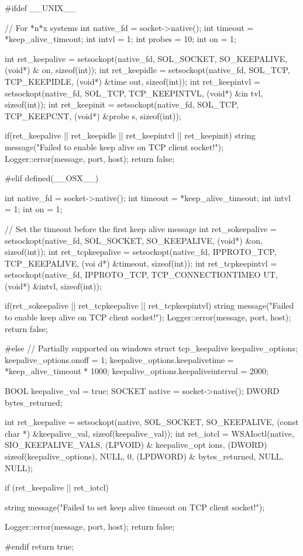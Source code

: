 \begin{DoxyCode}
{
#ifdef __UNIX__

    // For *n*x systems
    int native_fd = socket->native();
    int timeout = *keep_alive_timeout;
    int intvl = 1;
    int probes = 10;
    int on = 1;

    int ret_keepalive = setsockopt(native_fd, SOL_SOCKET, SO_KEEPALIVE, (void*) &
      on, sizeof(int));
    int ret_keepidle = setsockopt(native_fd, SOL_TCP, TCP_KEEPIDLE, (void*) &time
      out, sizeof(int));
    int ret_keepintvl = setsockopt(native_fd, SOL_TCP, TCP_KEEPINTVL, (void*) &in
      tvl, sizeof(int));
    int ret_keepinit = setsockopt(native_fd, SOL_TCP, TCP_KEEPCNT, (void*) &probe
      s, sizeof(int));

    if(ret_keepalive || ret_keepidle || ret_keepintvl || ret_keepinit)
    {
        string message("Failed to enable keep alive on TCP client socket!");
        Logger::error(message, port, host);
        return false;
    }

#elif defined(__OSX__)

    int native_fd = socket->native();
    int timeout = *keep_alive_timeout;
    int intvl = 1;
    int on = 1;

    // Set the timeout before the first keep alive message
    int ret_sokeepalive = setsockopt(native_fd, SOL_SOCKET, SO_KEEPALIVE, (void*)
       &on, sizeof(int));
    int ret_tcpkeepalive = setsockopt(native_fd, IPPROTO_TCP, TCP_KEEPALIVE, (voi
      d*) &timeout, sizeof(int));
    int ret_tcpkeepintvl = setsockopt(native_fd, IPPROTO_TCP, TCP_CONNECTIONTIMEO
      UT, (void*) &intvl, sizeof(int));

    if(ret_sokeepalive || ret_tcpkeepalive || ret_tcpkeepintvl)
    {
        string message("Failed to enable keep alive on TCP client socket!");
        Logger::error(message, port, host);
        return false;
    }

#else
    // Partially supported on windows
    struct tcp_keepalive keepalive_options;
    keepalive_options.onoff = 1;
    keepalive_options.keepalivetime = *keep_alive_timeout * 1000;
    keepalive_options.keepaliveinterval = 2000;

    BOOL keepalive_val = true;
    SOCKET native = socket->native();
    DWORD bytes_returned;

    int ret_keepalive = setsockopt(native, SOL_SOCKET, SO_KEEPALIVE, (const char 
      *) &keepalive_val, sizeof(keepalive_val));
    int ret_iotcl = WSAIoctl(native, SIO_KEEPALIVE_VALS, (LPVOID) & keepalive_opt
      ions, (DWORD) sizeof(keepalive_options), NULL, 0,
            (LPDWORD) & bytes_returned, NULL, NULL);

    if (ret_keepalive || ret_iotcl)
    {
        string message("Failed to set keep alive timeout on TCP client socket!");
      
        Logger::error(message, port, host);
        return false;
    }
#endif
    return true;
}
\end{DoxyCode}


